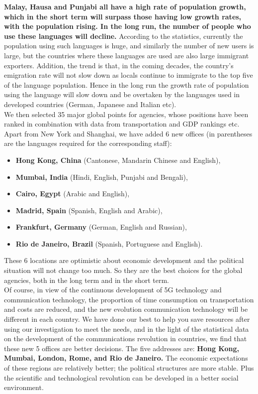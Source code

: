 \documentclass{mcmthesis}
\begin{document}
\hspace*{8mm}\textbf{Malay, Hausa and Punjabi all have a high rate of population growth, which in the short term will surpass those having low growth rates, with the population rising. In the long run, the number of people who use these languages will decline.} According to the statistics, currently the population using such languages is huge, and similarly the number of new users is large, but the countries where these languages are used are also large immigrant exporters. Addition, the trend is that, in the coming decades, the country's emigration rate will not slow down as locals continue to immigrate to the top five of the language population. Hence in the long run the growth rate of population using the language will slow down and be overtaken by the languages used in developed countries (German, Japanese and Italian etc).\\
\hspace*{8mm}We then selected 35 major global points for agencies, whose positions have been ranked in combination with data from transportation and GDP rankings etc. Apart from New York and Shanghai, we have added 6 new offices (in parentheses are the languages required for the corresponding staff): 
\begin{itemize}
\item \textbf{Hong Kong, China} (Cantonese, Mandarin Chinese and English), 
\item \textbf{Mumbai, India} (Hindi, English, Punjabi and Bengali), 
\item \textbf{Cairo, Egypt} (Arabic and English), 
\item \textbf{Madrid, Spain} (Spanish, English and Arabic), 
\item \textbf{Frankfurt, Germany} (German, English and Russian), 
\item \textbf{Rio de Janeiro, Brazil} (Spanish, Portuguese and English).
\end{itemize}
These 6 locations are optimistic about economic development and the political situation will not change too much. So they are the best choices for the global agencies, both in the long term and in the short term.\\
\hspace*{8mm}Of course, in view of the continuous development of 5G technology and communication technology, the proportion of time consumption on transportation and costs are reduced, and the new evolution communication technology will be different in each country. We have done our best to help you save resources after using our investigation to meet the needs, and in the light of the statistical data on the development of the communications revolution in countries, we find that these new 5 offices are better decisions. The five addresses are: \textbf{Hong Kong, Mumbai, London, Rome, and Rio de Janeiro.} The economic expectations of these regions are relatively better; the political structures are more stable. Plus the scientific and technological revolution can be developed in a better social environment.\\
\end{document}
